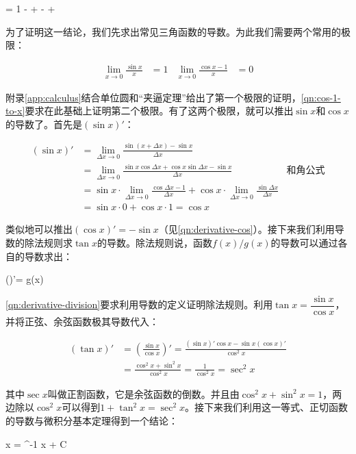 \documentclass[b5paper]{ctexart}
\begin{document}
\be
{} = 1 -  +  -  + \dotsb
\ee

为了证明这一结论，我们先求出常见三角函数的导数。为此我们需要两个常用的极限：

\begin{align}
\lim_{x \to 0} \frac{\sin x}{x} &= 1  & \lim_{x \to 0} \frac{\cos x - 1}{x} &= 0
\end{align}

附录\ref{app:calculus}结合单位圆和“夹逼定理”给出了第一个极限的证明，\cref{qn:cos-1-to-x}要求在此基础上证明第二个极限。有了这两个极限，就可以推出$\sin x$和$\cos x$的导数了。首先是$(\sin x)'$：

\begin{align*}
(\sin x)' &= \lim_{\Delta x \to 0} \frac{\sin(x + \Delta x) - \sin x}{\Delta x} \\
  &= \lim_{\Delta x \to 0} \frac{\sin x \cos \Delta x + \cos x\sin \Delta x - \sin x}{\Delta x} & \text{和角公式} \\
  &= \sin x \cdot \lim_{\Delta x \to 0} \frac{\cos \Delta x - 1}{\Delta x} + \cos x \cdot \lim_{\Delta x \to 0} \frac{\sin \Delta x}{\Delta x} \\
  &= \sin x \cdot 0 + \cos x \cdot 1 = \cos x
\end{align*}

类似地可以推出$(\cos x)' = - \sin x$（见\cref{qn:derivative-cos}）。接下来我们利用导数的除法规则求$\tan x$的导数。除法规则说，函数$f(x)/g(x)$的导数可以通过各自的导数求出：

\be
()'= \qquad {}g(x) 
\ee

\cref{qn:derivative-division}要求利用导数的定义证明除法规则。利用$\tan x = \dfrac{\sin x}{\cos x}$，并将正弦、余弦函数极其导数代入：

\begin{align*}
(\tan x)' & = (\frac{\sin x}{\cos x})' = \frac{(\sin x)'\cos x - \sin x (\cos x)'}{\cos^2 x} \\
 &= \frac{\cos^2 x + \sin^2 x}{\cos^2 x} = \frac{1}{\cos^2 x} = \sec^2 x
\end{align*}

其中$\sec x$叫做正割函数，它是余弦函数的倒数。并且由$\cos^2 x + \sin^2 x = 1$，两边除以$\cos^2 x$可以得到$1 + \tan^2 x = \sec^2 x$。接下来我们利用这一等式、正切函数的导数与微积分基本定理得到一个结论：

\be
\int {}  x = \tan^{-1} x + C
\ee
\end{document}
